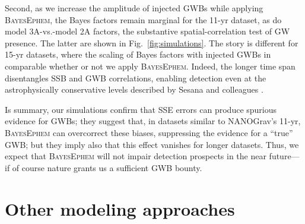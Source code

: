 \documentclass[iop,apj,twocolappendix]{emulateapj}
\begin{document}
Second, as we increase the amplitude of injected GWBs while applying \textsc{BayesEphem}, the Bayes factors remain marginal for the 11-yr dataset, as do model 3A-vs.-model 2A factors, the substantive spatial-correlation test of GW presence. The latter are shown in Fig.\ \ref{fig:simulations}.
The story is different for 15-yr datasets, where the scaling of Bayes factors with injected GWBs in comparable whether or not we apply \textsc{BayesEphem}. Indeed, the longer time span disentangles SSB and GWB correlations, enabling detection even at the astrophysically conservative levels described by Sesana and colleagues \citep{2016MNRAS.463L...6S}.

Is summary, our simulations confirm that SSE errors can produce spurious evidence for GWBs; they suggest that, in datasets similar to NANOGrav's 11-yr, \textsc{BayesEphem} can overcorrect these biases, suppressing the evidence for a ``true'' GWB; but they imply also that this effect vanishes for longer datasets. Thus, we expect that \textsc{BayesEphem} will not impair detection prospects in the near future---if of course nature grants us a sufficient GWB bounty.

\section{Other modeling approaches}
\label{sec:othermodels}
\end{document}
